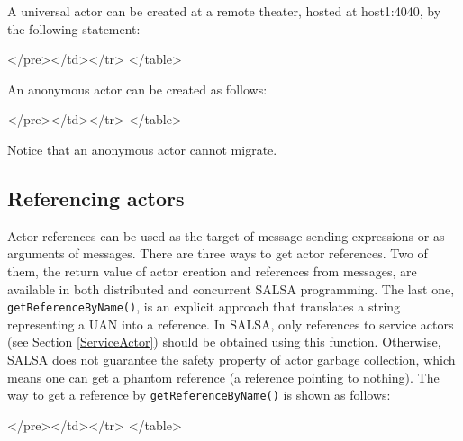 A universal actor can be created at a remote theater, hosted at host1:4040, 
by the following statement:
{\singlespace

}
\begin{htmlonly}

 \begin{rawhtml} 
   </pre></td></tr>
  </table>
\end{rawhtml} 
\end{htmlonly}
 
An anonymous actor can be created as follows:
{\singlespace

}
\begin{htmlonly}

 \begin{rawhtml} 
   </pre></td></tr>
  </table>
\end{rawhtml} 
\end{htmlonly}
 
Notice that an anonymous actor cannot migrate.

\subsection{Referencing actors}

Actor references can be used as the target of message sending expressions 
or as arguments of messages. 
There are three ways to get actor references. Two of them, the return 
value of actor creation and references from messages, are available 
in both distributed and concurrent SALSA programming. The last one, 
{\tt getReferenceByName()}, is an explicit approach that translates a 
string representing a UAN into a reference. In SALSA, only references 
to service actors (see Section \ref{ServiceActor}) should be obtained 
using this function. Otherwise, SALSA does not guarantee the safety property 
of actor garbage collection, which means one can get a phantom reference 
(a reference pointing to nothing). The way to get a reference by 
{\tt getReferenceByName()} is shown as follows:
{\singlespace

}
\begin{htmlonly}

 \begin{rawhtml} 
   </pre></td></tr>
  </table>
\end{rawhtml} 
\end{htmlonly}
 
